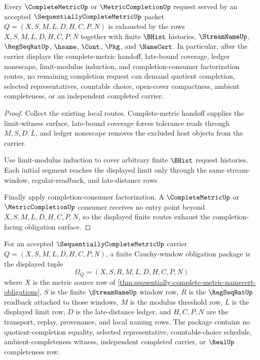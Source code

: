 \begin{theorem}
\label{thm:sequentially-complete-metric-completion-route-exhaustion}
Every $\CompleteMetricUp$ or $\MetricCompletionUp$ request served by an accepted $\SequentiallyCompleteMetricUp$ packet $Q=(X,S,M,L,D,H,C,P,N)$ is exhausted by the rows $X,S,M,L,D,H,C,P,N$ together with finite $\BHist$ histories, $\StreamNameUp$, $\RegSeqRatUp$, $\hsame$, $\Cont$, $\Pkg$, and $\NameCert$. In particular, after the carrier displays the complete-metric handoff, late-bound coverage, ledger nonescape, limit-modulus induction, and completion-consumer factorization routes, no remaining completion request can demand quotient completion, selected representatives, countable choice, open-cover compactness, ambient completeness, or an independent completed carrier.
\end{theorem}
\begin{proof}
Collect the existing local routes. Complete-metric handoff supplies the limit-witness surface, late-bound coverage forces tolerance reads through $M,S,D,L$, and ledger nonescape removes the excluded host objects from the carrier.

Use limit-modulus induction to cover arbitrary finite $\BHist$ request histories. Each initial segment reaches the displayed limit only through the same stream-window, regular-readback, and late-distance rows.

Finally apply completion-consumer factorization. A $\CompleteMetricUp$ or $\MetricCompletionUp$ consumer receives no entry point beyond $X,S,M,L,D,H,C,P,N$, so the displayed finite routes exhaust the completion-facing obligation surface.
\end{proof}

\begin{definition}
\label{def:sequentially-complete-metric-finite-cauchy-window}
For an accepted $\SequentiallyCompleteMetricUp$ carrier $Q=(X,S,M,L,D,H,C,P,N)$, a finite Cauchy-window obligation package is the displayed tuple
$$
\Omega_Q=(X,S,R,M,L,D,H,C,P,N)
$$
where $X$ is the metric source row of \autoref{thm:sequentially-complete-metric-namecert-obligations}, $S$ is the finite $\StreamNameUp$ window row, $R$ is the $\RegSeqRatUp$ readback attached to those windows, $M$ is the modulus threshold row, $L$ is the displayed limit row, $D$ is the late-distance ledger, and $H,C,P,N$ are the transport, replay, provenance, and local naming rows. The package contains no quotient-completion equality, selected representative, countable-choice schedule, ambient-completeness witness, independent completed carrier, or $\RealUp$ completeness row.
\end{definition}

